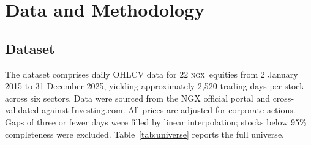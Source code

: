\documentclass[twoside,11pt]{article}
\newcommand{\ngx}{\textsc{ngx}}
\begin{document}
%	
%	
%	
%	
	\section{Data and Methodology}
	\label{sec:data}
	
	\subsection{Dataset}
	
	The dataset comprises daily OHLCV data for 22 \ngx\ equities from 2 January 2015 to 31 December 2025, yielding approximately 2,520 trading days per stock across six sectors. Data were sourced from the NGX official portal and cross-validated against Investing.com. All prices are adjusted for corporate actions. Gaps of three or fewer days were filled by linear interpolation; stocks below 95\% completeness were excluded. Table~\ref{tab:universe} reports the full universe.
	
\end{document}
